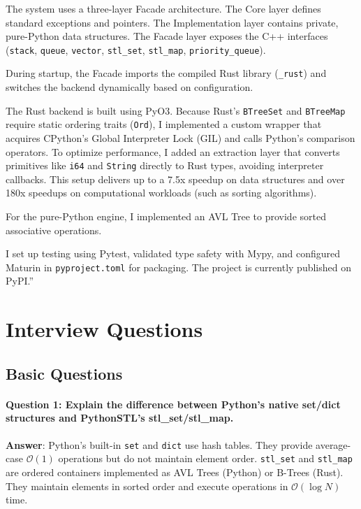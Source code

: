 \documentclass[11pt,a4paper]{article}
\begin{document}
The system uses a three-layer Facade architecture. The Core layer defines standard exceptions and pointers. The Implementation layer contains private, pure-Python data structures. The Facade layer exposes the C++ interfaces (\texttt{stack}, \texttt{queue}, \texttt{vector}, \texttt{stl\_set}, \texttt{stl\_map}, \texttt{priority\_queue}). 

During startup, the Facade imports the compiled Rust library (\texttt{\_rust}) and switches the backend dynamically based on configuration.

The Rust backend is built using PyO3. Because Rust's \texttt{BTreeSet} and \texttt{BTreeMap} require static ordering traits (\texttt{Ord}), I implemented a custom wrapper that acquires CPython's Global Interpreter Lock (GIL) and calls Python's comparison operators. To optimize performance, I added an extraction layer that converts primitives like \texttt{i64} and \texttt{String} directly to Rust types, avoiding interpreter callbacks. This setup delivers up to a 7.5x speedup on data structures and over 180x speedups on computational workloads (such as sorting algorithms).

For the pure-Python engine, I implemented an AVL Tree to provide sorted associative operations. 

I set up testing using Pytest, validated type safety with Mypy, and configured Maturin in \texttt{pyproject.toml} for packaging. The project is currently published on PyPI.''

\newpage

\section{Interview Questions}

\subsection{Basic Questions}

\paragraph{Question 1: Explain the difference between Python's native set/dict structures and PythonSTL's stl\_set/stl\_map.}
\textbf{Answer}: Python's built-in \texttt{set} and \texttt{dict} use hash tables. They provide average-case $\mathcal{O}(1)$ operations but do not maintain element order. \texttt{stl\_set} and \texttt{stl\_map} are ordered containers implemented as AVL Trees (Python) or B-Trees (Rust). They maintain elements in sorted order and execute operations in $\mathcal{O}(\log N)$ time.
\end{document}
